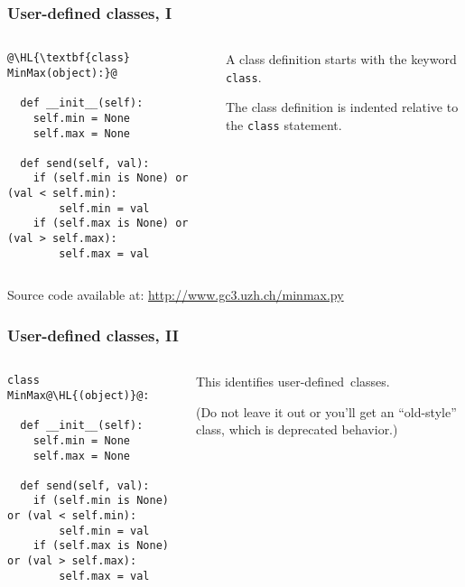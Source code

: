 \documentclass[english,serif,mathserif,xcolor=pdftex,dvipsnames,table]{beamer}
\begin{document}
\begin{frame}[fragile]
  \frametitle{User-defined classes, I}
  \begin{columns}[t]
    \begin{column}{0.5\textwidth}
\begin{lstlisting}
@\HL{\textbf{class} MinMax(object):}@

  def __init__(self):
    self.min = None
    self.max = None

  def send(self, val):
    if (self.min is None) or (val < self.min):
        self.min = val
    if (self.max is None) or (val > self.max):
        self.max = val
\end{lstlisting}
    \end{column}
    \begin{column}{0.5\textwidth}
      \raggedleft
      A class definition starts with the keyword \texttt{class}.

      The class definition is indented relative to the \texttt{class}
      statement.
    \end{column}
  \end{columns}

  \+
  {\scriptsize Source code available at:
    \url{http://www.gc3.uzh.ch/minmax.py}}
\end{frame}


\begin{frame}[fragile]
  \frametitle{User-defined classes, II}
  \begin{columns}[t]
    \begin{column}{0.5\textwidth}
\begin{lstlisting}
class MinMax@\HL{(object)}@:

  def __init__(self):
    self.min = None
    self.max = None

  def send(self, val):
    if (self.min is None) or (val < self.min):
        self.min = val
    if (self.max is None) or (val > self.max):
        self.max = val
\end{lstlisting}
    \end{column}
    \begin{column}{0.5\textwidth}
      \raggedleft
      This identifies user-defined~classes.

      \+
      (Do not leave it out or you'll get an ``old-style'' class, which
      is deprecated behavior.)
    \end{column}
  \end{columns}
\end{frame}
\end{document}
